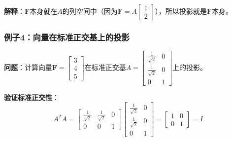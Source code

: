 \documentclass[12pt,a4paper]{article}
\begin{document}
\textbf{解释}：$\bm{F}$本身就在$A$的列空间中（因为$\bm{F} = A \begin{bmatrix} 1 \\ 2 \end{bmatrix}$），所以投影就是$\bm{F}$本身。

\subsubsection{例子4：向量在标准正交基上的投影}

\textbf{问题}：计算向量$\bm{F} = \begin{bmatrix} 3 \\ 4 \\ 5 \end{bmatrix}$在标准正交基$A = \begin{bmatrix} \frac{1}{\sqrt{2}} & 0 \\ \frac{1}{\sqrt{2}} & 0 \\ 0 & 1 \end{bmatrix}$上的投影。

\textbf{验证标准正交性}：
\begin{equation}
A^T A = \begin{bmatrix} \frac{1}{\sqrt{2}} & \frac{1}{\sqrt{2}} & 0 \\ 0 & 0 & 1 \end{bmatrix} \begin{bmatrix} \frac{1}{\sqrt{2}} & 0 \\ \frac{1}{\sqrt{2}} & 0 \\ 0 & 1 \end{bmatrix} = \begin{bmatrix} 1 & 0 \\ 0 & 1 \end{bmatrix} = I
\end{equation}
\end{document}
